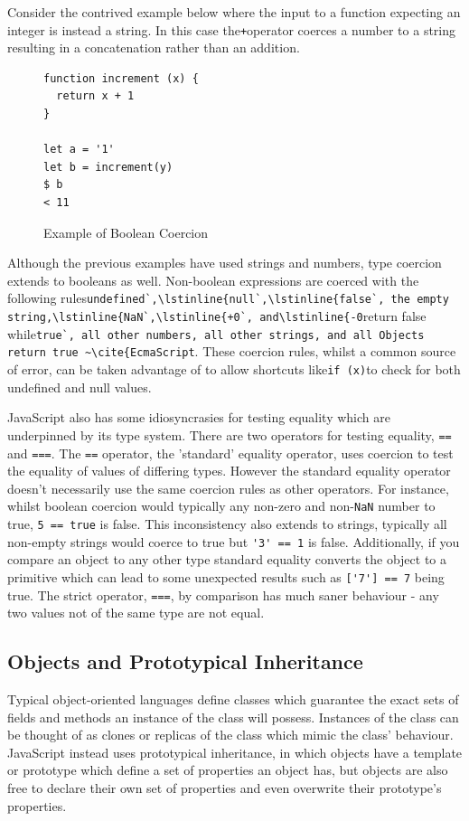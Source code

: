 \documentclass[]{final_report}
\begin{document}
Consider the contrived example below where the input to a function expecting an integer is instead a string. In this case the\lstinline{+}operator coerces a number to a string resulting in a concatenation rather than an addition.

\begin{figure}[h]
\begin{verbatim}
function increment (x) {
  return x + 1
}

let a = '1'
let b = increment(y)
$ b
< 11
\end{verbatim}
\caption{\label{fig:js-bool-coercion} Example of Boolean Coercion}
\end{figure} 

Although the previous examples have used strings and numbers, type coercion extends to booleans as well. Non-boolean expressions are coerced with the following rules\lstinline{undefined`,\lstinline{null`,\lstinline{false`, the empty string,\lstinline{NaN`,\lstinline{+0`, and\lstinline{-0}return false while\lstinline{true`, all other numbers, all other strings, and all Objects return true ~\cite{EcmaScript}. These coercion rules, whilst a common source of error, can be taken advantage of to allow shortcuts like\lstinline{if (x)}to check for both undefined and null values.

JavaScript also has some idiosyncrasies for testing equality which are underpinned by its type system. There are two operators for testing equality, \lstinline{==} and \lstinline{===}.  The \lstinline{==} operator, the 'standard' equality operator, uses coercion to test the equality of values of differing types. However the standard equality operator doesn't necessarily use the same coercion rules as other operators. For instance, whilst boolean coercion would typically any non-zero and non-\lstinline{NaN} number to true,  \lstinline{5 == true} is false. This inconsistency also extends to strings, typically all non-empty strings would coerce to true but \lstinline{'3' == 1} is false. Additionally, if you compare an object to any other type standard equality converts the object to a primitive which can lead to some unexpected results such as \lstinline{['7'] == 7}  being true. The strict operator, \lstinline{===}, by comparison has much saner behaviour - any two values not of the same type are not equal.

\subsection{Objects and Prototypical Inheritance}
Typical object-oriented languages define classes which guarantee the exact sets of fields and methods an instance of the class will possess. Instances of the class can be thought of as clones or replicas of the class which mimic the class' behaviour. JavaScript instead uses prototypical inheritance, in which objects have a template or prototype which define a set of properties an object has, but objects are also free to declare their own set of properties and even overwrite their prototype's properties. 
\end{document}
